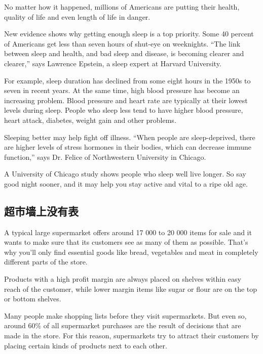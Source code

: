 No matter how it happened, millions of Americans are
putting their health, quality of life and even length of life in
danger.

New evidence shows why getting enough sleep is
a top priority. Some 40 percent of Americans get less than
seven hours of shut-eye on weeknights. “The link between
sleep and health, and bad sleep and disease, is becoming
clearer and clearer,” says Lawrence Epstein, a sleep
expert at Harvard University.

For example, sleep duration has declined from some
eight hours in the 1950s to seven in recent years. At the
same time, high blood pressure has become an increasing
problem. Blood pressure and heart rate are typically at
their lowest levels during sleep. People who sleep less
tend to have higher blood pressure, heart attack, diabetes,
weight gain and other problems.

Sleeping better may help fight off illness. “When
people are sleep-deprived, there are higher levels of
stress hormones in their bodies, which can decrease immune
function,” says Dr. Felice of Northwestern University
in Chicago.

A University of Chicago study shows people who sleep
well live longer. So say good night sooner, and it may help
you stay active and vital to a ripe old age.
\subsection{超市墙上没有表}
\begin{margintable}\vspace{-2cm}\footnotesize
\end{margintable}
A typical large supermarket offers around 17 000 to 20 000
items for sale and it wants to make sure that its customers
see as many of them as possible. That's why you'll
only find essential goods like bread, vegetables and meat
in completely different parts of the store.

Products with a high profit margin are always placed
on shelves within easy reach of the customer, while lower
margin items like sugar or flour are on the top or bottom
shelves.

Many people make shopping lists before they visit
supermarkets. But even so, around 60\% of all supermarket
purchases are the result of decisions that are made in the
store. For this reason, supermarkets try to attract their customers
by placing certain kinds of products next to each
other.

